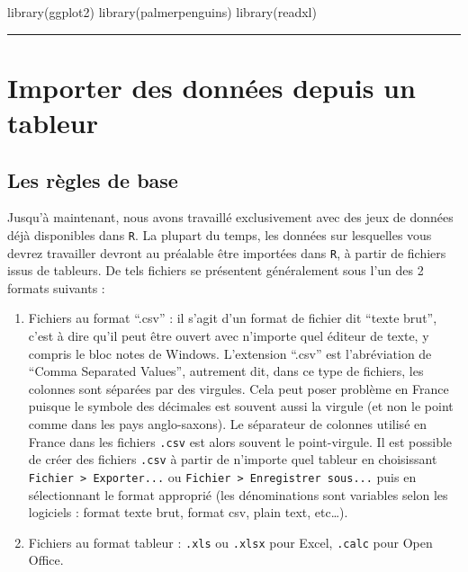 \documentclass[
  letterpaper,
  DIV=11,
  numbers=noendperiod]{scrreprt}
\newenvironment{Shaded}{\begin{snugshade}}{\end{snugshade}}
\newcommand{\FunctionTok}[1]{\textcolor[rgb]{0.28,0.35,0.67}{#1}}
\newcommand{\NormalTok}[1]{\textcolor[rgb]{0.00,0.23,0.31}{#1}}
\providecommand{\tightlist}{%
  \setlength{\itemsep}{0pt}\setlength{\parskip}{0pt}}\usepackage{longtable,booktabs,array}
\begin{document}
\begin{Shaded}
\begin{Highlighting}[]
\FunctionTok{library}\NormalTok{(ggplot2)}
\FunctionTok{library}\NormalTok{(palmerpenguins)}
\FunctionTok{library}\NormalTok{(readxl)}
\end{Highlighting}
\end{Shaded}

\begin{center}\rule{0.5\linewidth}{0.5pt}\end{center}

\hypertarget{importer-des-donnuxe9es-depuis-un-tableur}{%
\section{Importer des données depuis un
tableur}\label{importer-des-donnuxe9es-depuis-un-tableur}}

\hypertarget{les-ruxe8gles-de-base}{%
\subsection{Les règles de base}\label{les-ruxe8gles-de-base}}

Jusqu'à maintenant, nous avons travaillé exclusivement avec des jeux de
données déjà disponibles dans \texttt{R}. La plupart du temps, les
données sur lesquelles vous devrez travailler devront au préalable être
importées dans \texttt{R}, à partir de fichiers issus de tableurs. De
tels fichiers se présentent généralement sous l'un des 2 formats
suivants :

\begin{enumerate}
\def\labelenumi{\arabic{enumi}.}
\tightlist
\item
  Fichiers au format ``.csv'' : il s'agit d'un format de fichier dit
  ``texte brut'', c'est à dire qu'il peut être ouvert avec n'importe
  quel éditeur de texte, y compris le bloc notes de Windows. L'extension
  ``.csv'' est l'abréviation de ``Comma Separated Values'', autrement
  dit, dans ce type de fichiers, les colonnes sont séparées par des
  virgules. Cela peut poser problème en France puisque le symbole des
  décimales est souvent aussi la virgule (et non le point comme dans les
  pays anglo-saxons). Le séparateur de colonnes utilisé en France dans
  les fichiers \texttt{.csv} est alors souvent le point-virgule. Il est
  possible de créer des fichiers \texttt{.csv} à partir de n'importe
  quel tableur en choisissant
  \texttt{Fichier\ \textgreater{}\ Exporter...} ou
  \texttt{Fichier\ \textgreater{}\ Enregistrer\ sous...} puis en
  sélectionnant le format approprié (les dénominations sont variables
  selon les logiciels : format texte brut, format csv, plain text,
  etc\ldots).
\item
  Fichiers au format tableur : \texttt{.xls} ou \texttt{.xlsx} pour
  Excel, \texttt{.calc} pour Open Office.
\end{enumerate}
\end{document}

